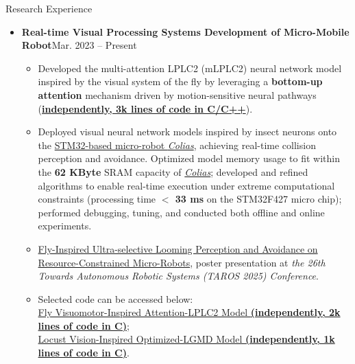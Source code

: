 \documentclass{resume} %
\begin{document}
\begin{rSection}{Research Experience}
\begin{itemize}[left = -0.22in]
	
	
	\item \textbf{Real-time Visual Processing Systems Development of Micro-Mobile Robot}\hfill Mar. 2023 -- Present
	\begin{itemize}[label=\textopenbullet] %

		
		\item 
		Developed the multi-attention LPLC2 (mLPLC2) neural network model inspired by the visual system of the fly by leveraging a \textbf{bottom-up attention} mechanism driven by motion-sensitive neural pathways
		(\href{https://github.com/Ryannnice/Offline_Multi-Attention_LPLC2_Model/blob/main/LPLC2.cpp}{\textbf{independently, 3k lines of code in C/C++}}).
		
		\vspace{-0.3em}
		
		\item 
		Deployed visual neural network models inspired by insect neurons onto the \href{https://link.springer.com/chapter/10.1007/978-3-319-96728-8_17}{STM32-based micro-robot \textit{Colias}}, achieving real-time collision perception and avoidance.
		Optimized model memory usage to fit within the \textbf{62 KByte} SRAM capacity of \href{https://link.springer.com/chapter/10.1007/978-3-319-96728-8_17}{\textit{Colias}};
		developed and refined algorithms to enable real-time execution under extreme computational constraints (processing time \textbf{$<$ 33 ms} on the STM32F427 micro chip);
		performed debugging, tuning, and conducted both offline and online experiments.
		
		\vspace{-0.3em}
		\item 
		\href{https://ryannnice.github.io/assets/TAROS_2025_Poster_100.pdf}
		{Fly-Inspired Ultra-selective Looming Perception and Avoidance on Resource-Constrained Micro-Robots}, poster presentation at \textit{the 26th Towards Autonomous Robotic Systems (TAROS 2025) Conference}.
		
		\vspace{-0.3em}
		\item 
		Selected code can be accessed below: \\
		\href{https://github.com/Ryannnice/neuro-life-project/blob/main/micro_embodied/colias_core/coliasSense_LPLC2.c}
		{Fly Visuomotor-Inspired Attention-LPLC2 Model \textbf{(independently, 2k lines of code in C)}}; \\
		\href{https://github.com/Ryannnice/Optimized-LGMD/blob/main/coliasSense_LGMD.c}
		{Locust Vision-Inspired Optimized-LGMD Model \textbf{(independently, 1k lines of code in C)}}.
		

\end{itemize}
\end{itemize}
\end{rSection}
\end{document}
